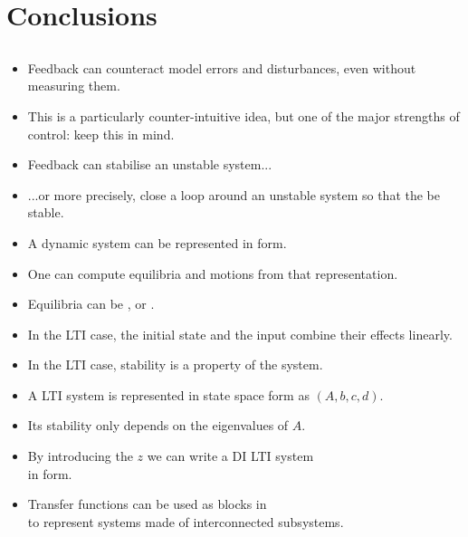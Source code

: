 \section{Conclusions}
\subsection{}

\begin{frame}
\myPause
 \begin{itemize}[<+-| alert@+>]
 \item Feedback can counteract model errors and disturbances, even without measuring them.
 \item This is a particularly counter-intuitive idea, but one of the major strengths of control: keep this in mind.
 \item Feedback can stabilise an unstable system...
 \item ...or more precisely, close a loop around an unstable system so that the  be stable.
 \item A dynamic system can be represented in  form.
 \item One can compute equilibria and motions from that representation.
 \item Equilibria can be ,  or .
 \end{itemize}
\end{frame}

\begin{frame}
\myPause
 \begin{itemize}[<+-| alert@+>]
 \item In the LTI case, the initial state and the input combine their effects linearly.
 \item In the LTI case, stability is a property of the system.
 \item A LTI system is represented in state space form as $(A,b,c,d)$.
 \item Its stability only depends on the eigenvalues of $A$.
 \item By introducing the  $z$ we can write a DI LTI system\\
       in  form.
 \item Transfer functions can be used as blocks in \\
       to represent systems made of interconnected subsystems.
 \end{itemize}
\end{frame}

